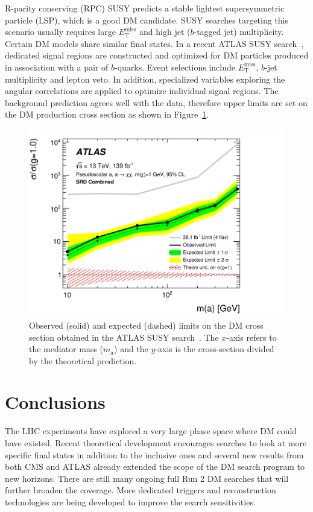\documentclass{moriond}
\def\et{E_\mathrm{T}^{\mathrm{miss}}}
\begin{document}
R-parity conserving (RPC) SUSY predicts a stable lightest supersymmetric
particle (LSP), which is a good DM candidate. SUSY searches targeting this
scenario usually requires large $\et$ and high jet ($b$-tagged jet)
multiplicity. Certain DM models share similar final states. In a recent ATLAS
SUSY search~\cite{dmbb}, dedicated signal regions are constructed and optimized
for DM particles produced in association with a pair of $b$-quarks. Event
selections include $\et$, $b$-jet multiplicity and lepton veto. In addition,
specialized variables exploring the angular correlations are applied to optimize individual signal regions. The
background prediction agrees well with the data, therefore upper limits are set
on the DM production cross section as shown in Figure~\ref{fig:dmbb}.   

\begin{figure} [htb]
\centerline{\includegraphics[width=0.5\linewidth]{DMBB}}
\caption[]{Observed (solid) and expected (dashed) limits on the DM cross section obtained in the ATLAS SUSY search~\cite{dmbb}. The $x$-axis refers to the mediator mass ($m_{\mathrm{a}}$) and the $y$-axis is the cross-section divided by the theoretical prediction.}
\label{fig:dmbb}
\end{figure}

\section{Conclusions}

The LHC experiments have explored a very large phase space where DM could have existed.  Recent
theoretical development encourages searches to look at more specific final
states in addition to the inclusive ones and several new results from both CMS
and ATLAS already extended the scope of the DM search program to new horizons.
There are still many ongoing full Run 2 DM searches that will further broaden
the coverage. More dedicated triggers and reconstruction technologies are
being developed to improve the search sensitivities. 
\end{document}
